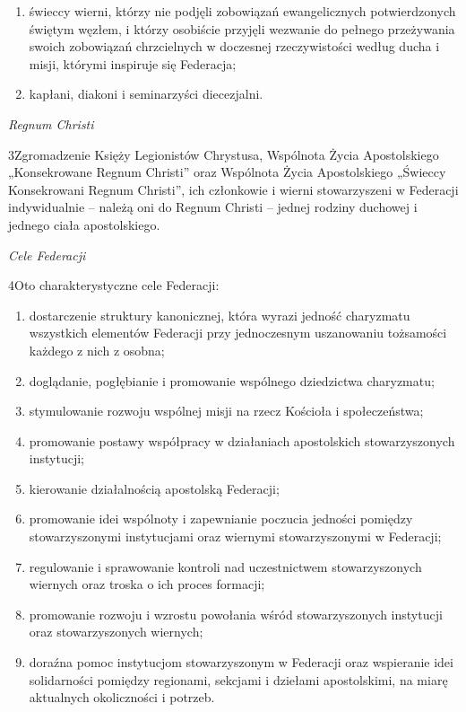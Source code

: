 ﻿\documentclass{book}
\newcommand{\lett}[1]{\lettrine[findent=6pt]{#1}}
\newcommand{\ssec}[1]{\vspace{1em}\textit{#1}\vspace{.5em}\nopagebreak}
\begin{document}
\begin{enumerate}


\item świeccy wierni, którzy nie podjęli zobowiązań ewangelicznych potwierdzonych świętym węzłem, i którzy osobiście przyjęli wezwanie do pełnego przeżywania swoich zobowiązań chrzcielnych w doczesnej rzeczywistości według ducha i misji, którymi inspiruje się Federacja;


\item kapłani, diakoni i seminarzyści diecezjalni.


\end{enumerate}
 
\ssec{Regnum Christi}


\lett{3} Zgromadzenie Księży Legionistów Chrystusa, Wspólnota Życia Apostolskiego „Konsekrowane Regnum Christi” oraz Wspólnota Życia Apostolskiego „Świeccy Konsekrowani Regnum Christi”, ich członkowie i wierni stowarzyszeni w Federacji indywidualnie – należą oni do Regnum Christi – jednej rodziny duchowej i jednego ciała apostolskiego.


\ssec{Cele Federacji}


\lett{4} Oto charakterystyczne  cele Federacji:


\begin{enumerate}


\item dostarczenie struktury kanonicznej, która wyrazi jedność charyzmatu wszystkich elementów Federacji przy jednoczesnym uszanowaniu tożsamości każdego z nich z osobna;


\item doglądanie, pogłębianie i promowanie wspólnego dziedzictwa charyzmatu;


\item stymulowanie rozwoju wspólnej misji na rzecz Kościoła i społeczeństwa;


\item promowanie postawy współpracy w działaniach apostolskich stowarzyszonych instytucji;


\item kierowanie działalnością apostolską Federacji;


\item promowanie idei wspólnoty i zapewnianie poczucia jedności pomiędzy stowarzyszonymi instytucjami oraz wiernymi stowarzyszonymi w Federacji;


\item regulowanie i sprawowanie kontroli nad uczestnictwem stowarzyszonych wiernych oraz troska o ich proces formacji;


\item promowanie rozwoju i wzrostu powołania wśród stowarzyszonych instytucji oraz stowarzyszonych wiernych;


\item doraźna pomoc instytucjom stowarzyszonym w Federacji oraz wspieranie idei solidarności pomiędzy regionami, sekcjami i dziełami apostolskimi, na miarę aktualnych okoliczności i potrzeb.


\end{enumerate}
 
\end{document}
